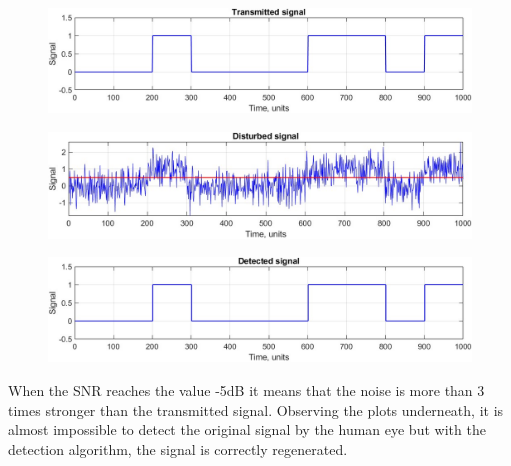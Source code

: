 \begin{figure}[h!]
    \centering
    \includegraphics[width = .85\textwidth]{lab-2/imgs/task4.3_Transmitted.jpg}
\end{figure}
\vspace{-15px}
\begin{figure}[h!]
    \centering
    \includegraphics[width = .85\textwidth]{lab-2/imgs/task4.3_Noise.jpg}
\end{figure}
\vspace{-15px}
\begin{figure}[h!]
    \centering
    \includegraphics[width = .85\textwidth]{lab-2/imgs/task4.3_Detected.jpg}
\end{figure}

\FloatBarrier\noindent When the SNR reaches the value -5dB it means that the noise is more than 3 times stronger than the transmitted signal. Observing the plots underneath, it is almost impossible to detect the original signal by the human eye but with the detection algorithm, the signal is correctly regenerated. 

